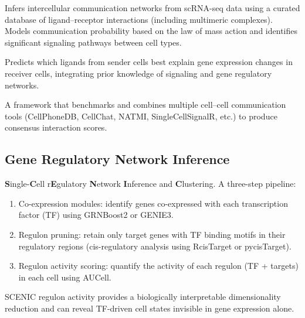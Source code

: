 \begin{description}[style=nextline]
  \item[\software{CellChat}] Infers intercellular communication networks from
    scRNA-seq data using a curated database of ligand--receptor interactions
    (including multimeric complexes). Models communication probability based on
    the law of mass action and identifies significant signaling pathways between
    cell types.
  \item[\software{NicheNet}] Predicts which ligands from sender cells best
    explain gene expression changes in receiver cells, integrating prior
    knowledge of signaling and gene regulatory networks.
  \item[\software{LIANA}] A framework that benchmarks and combines multiple
    cell--cell communication tools (CellPhoneDB, CellChat, NATMI,
    SingleCellSignalR, etc.) to produce consensus interaction scores.
\end{description}

\subsection{Gene Regulatory Network Inference}

\begin{description}[style=nextline]
  \item[\software{SCENIC / pySCENIC}] \textbf{S}ingle-\textbf{C}ell r\textbf{E}gulatory
    \textbf{N}etwork \textbf{I}nference and \textbf{C}lustering. A three-step
    pipeline:
    \begin{enumerate}[nosep]
      \item Co-expression modules: identify genes co-expressed with each
        transcription factor (TF) using GRNBoost2 or GENIE3.
      \item Regulon pruning: retain only target genes with TF binding motifs
        in their regulatory regions (cis-regulatory analysis using RcisTarget
        or pycisTarget).
      \item Regulon activity scoring: quantify the activity of each regulon
        (TF + targets) in each cell using AUCell.
    \end{enumerate}
    SCENIC regulon activity provides a biologically interpretable dimensionality
    reduction and can reveal TF-driven cell states invisible in gene expression
    alone.
\end{description}


